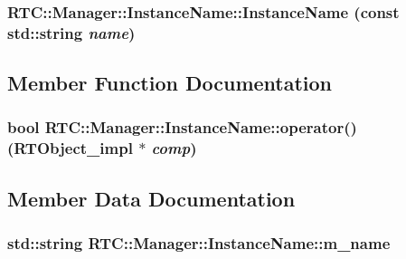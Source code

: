 \subsubsection[{InstanceName}]{\setlength{\rightskip}{0pt plus 5cm}RTC::Manager::InstanceName::InstanceName (const std::string {\em name})}\label{structRTC_1_1Manager_1_1InstanceName_aeaccb5c948903147fec54a30244aeeab}


\subsection{Member Function Documentation}
\subsubsection[{operator()}]{\setlength{\rightskip}{0pt plus 5cm}bool RTC::Manager::InstanceName::operator() ({\bf RTObject\_\-impl} $\ast$ {\em comp})}\label{structRTC_1_1Manager_1_1InstanceName_aea1ede840c201f3e9afd68385e4b9a9d}


\subsection{Member Data Documentation}
\subsubsection[{m\_\-name}]{\setlength{\rightskip}{0pt plus 5cm}std::string {\bf RTC::Manager::InstanceName::m\_\-name}}\label{structRTC_1_1Manager_1_1InstanceName_aa3744c310d19e37f9a793b0837f744b2}
